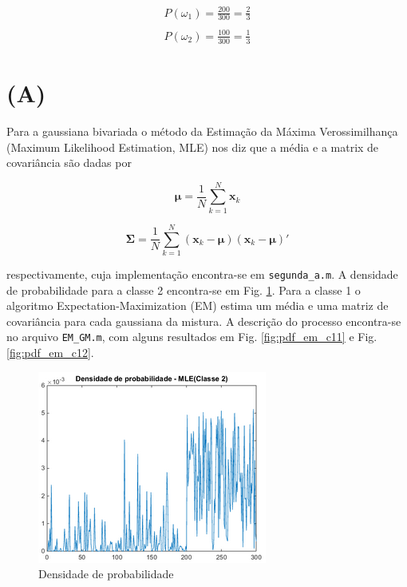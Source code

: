 \documentclass[12pt,twoside]{report}
\newcommand{\figureref}[1]{Fig. \ref{fig:#1}}
\newcommand{\captiontext}[1]{\small{#1}}
\newcommand{\code}[1]{\texttt{#1}}
\begin{document}
\begin{equation}
\begin{split}
P(\omega_1) = \frac{200}{300} = \frac{2}{3}\\\\
P(\omega_2) = \frac{100}{300} = \frac{1}{3}
\end{split}
\label{eq:prob_priori}
\end{equation}

\section*{(A)}

Para a gaussiana bivariada o método da Estimação da Máxima Verossimilhança
(Maximum Likelihood Estimation, MLE) nos diz que a média e a matrix de covariância
são dadas por

\begin{minipage}[b]{0.45\linewidth}
    \begin{equation}
    \mathbf{\mu} = \frac{1}{N} \sum_{k=1}^N \mathbf{x}_k
    \label{eq:letra_a_mean}
    \end{equation}
\end{minipage}
\hfill
\begin{minipage}[b]{0.45\linewidth}
    \begin{equation}
    \mathbf{\Sigma} = \frac{1}{N} \sum_{k=1}^N (\mathbf{x}_k - \mathbf{\mu})(\mathbf{x}_k - \mathbf{\mu})'
    \label{eq:letra_a_covariance}
    \end{equation}
\end{minipage}

\noindent respectivamente, cuja implementação encontra-se em \code{segunda\_a.m}.
A densidade de probabilidade para a classe 2 encontra-se em \figureref{pdf_mle_c2}.
Para a classe 1 o algoritmo Expectation-Maximization (EM) estima um média e uma
matriz de covariância para cada gaussiana da mistura. A descrição do processo
encontra-se no arquivo \code{EM\_GM.m}, com alguns resultados em \figureref{pdf_em_c11}
e \figureref{pdf_em_c12}.

\begin{figure}[H]
    \centering
    \includegraphics[scale=0.75]{pdf_mle_c2}
    \caption{\captiontext{Densidade de probabilidade}}
    \label{fig:pdf_mle_c2}
\end{figure}
\end{document}
